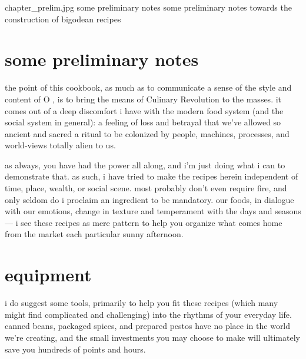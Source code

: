 \mychapter
{chapter_prelim.jpg}
{some preliminary notes}
{some preliminary notes towards the construction of bigodean recipes}

\section{some preliminary notes}

the point of this cookbook, as much as to communicate a sense of the
style and content of O , is to bring the means of Culinary
Revolution to the masses. it comes out of a deep discomfort i have
with the modern food system (and the social system in general): a
feeling of loss and betrayal that we've allowed so ancient and sacred
a ritual to be colonized by people, machines, processes, and
world-views totally alien to us.

as always, you have had the power all along, and i'm just doing what i
can to demonstrate that. as such, i have tried to make the recipes
herein independent of time, place, wealth, or social scene. most
probably don't even require fire, and only seldom do i proclaim an
ingredient to be mandatory.  our foods, in dialogue with our emotions,
change in texture and temperament with the days and seasons --- i see
these recipes as mere pattern to help you organize what comes home
from the market each particular sunny afternoon.
  
\section{equipment}

i do suggest some tools, primarily to help you fit these recipes
(which many might find complicated and challenging) into the rhythms
of your everyday life. canned beans, packaged spices, and prepared
pestos have no place in the world we're creating, and the small
investments you may choose to make will ultimately save you hundreds
of points and hours.

